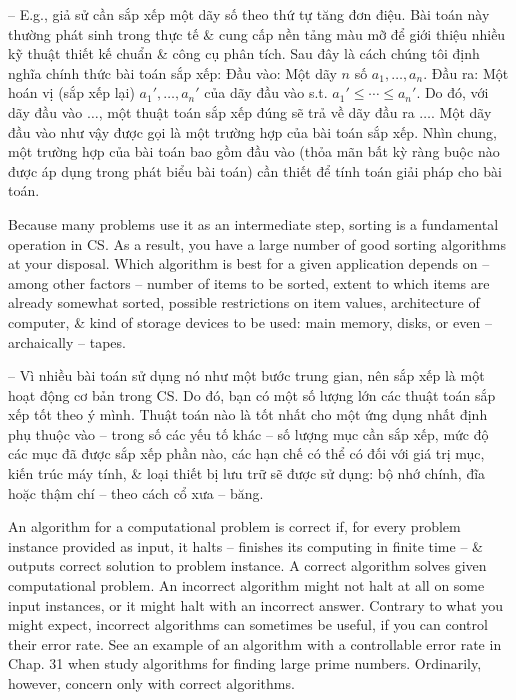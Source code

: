 \documentclass{article}
\begin{document}
\begin{itemize}
\begin{itemize}
\begin{itemize}
            -- E.g., giả sử cần sắp xếp một dãy số theo thứ tự tăng đơn điệu. Bài toán này thường phát sinh trong thực tế \& cung cấp nền tảng màu mỡ để giới thiệu nhiều kỹ thuật thiết kế chuẩn \& công cụ phân tích. Sau đây là cách chúng tôi định nghĩa chính thức bài toán sắp xếp: Đầu vào: Một dãy $n$ số $a_1,\ldots,a_n$. Đầu ra: Một hoán vị (sắp xếp lại) $a_1',\ldots,a_n'$ của dãy đầu vào s.t. $a_1'\le\cdots\le a_n'$. Do đó, với dãy đầu vào $\ldots$, một thuật toán sắp xếp đúng sẽ trả về dãy đầu ra $\ldots$. Một dãy đầu vào như vậy được gọi là một trường hợp của bài toán sắp xếp. Nhìn chung, một trường hợp của bài toán bao gồm đầu vào (thỏa mãn bất kỳ ràng buộc nào được áp dụng trong phát biểu bài toán) cần thiết để tính toán giải pháp cho bài toán.
            
            Because many problems use it as an intermediate step, sorting is a fundamental operation in CS. As a result, you have a large number of good sorting algorithms at your disposal. Which algorithm is best for a given application depends on -- among other factors -- number of items to be sorted, extent to which items are already somewhat sorted, possible restrictions on item values, architecture of computer, \& kind of storage devices to be used: main memory, disks, or even -- archaically -- tapes.
            
            -- Vì nhiều bài toán sử dụng nó như một bước trung gian, nên sắp xếp là một hoạt động cơ bản trong CS. Do đó, bạn có một số lượng lớn các thuật toán sắp xếp tốt theo ý mình. Thuật toán nào là tốt nhất cho một ứng dụng nhất định phụ thuộc vào -- trong số các yếu tố khác -- số lượng mục cần sắp xếp, mức độ các mục đã được sắp xếp phần nào, các hạn chế có thể có đối với giá trị mục, kiến trúc máy tính, \& loại thiết bị lưu trữ sẽ được sử dụng: bộ nhớ chính, đĩa hoặc thậm chí -- theo cách cổ xưa -- băng.
            
            An algorithm for a computational problem is correct if, for every problem instance provided as input, it halts -- finishes its computing in finite time -- \& outputs correct solution to problem instance. A correct algorithm solves given computational problem. An incorrect algorithm might not halt at all on some input instances, or it might halt with an incorrect answer. Contrary to what you might expect, incorrect algorithms can sometimes be useful, if you can control their error rate. See an example of an algorithm with a controllable error rate in Chap. 31 when study algorithms for finding large prime numbers. Ordinarily, however, concern only with correct algorithms.
            

\end{itemize}
\end{itemize}
\end{itemize}
\end{document}
